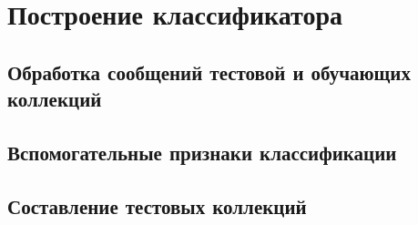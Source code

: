 \newpage
\section{Построение классификатора}
    \subsection{Обработка сообщений тестовой и обучающих коллекций}
    \subsection{Вспомогательные признаки классификации}
    \subsection{Составление тестовых коллекций}
